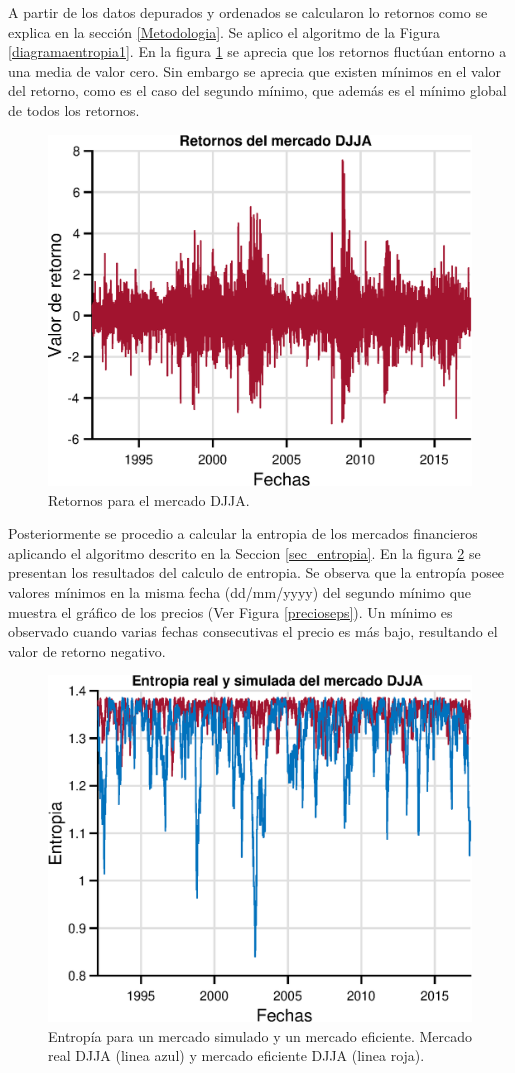 A partir de los datos depurados y ordenados se calcularon lo retornos como se explica en la sección \ref{Metodologia}. Se aplico el algoritmo de la Figura \ref{diagramaentropia1}. 
En la figura \ref{onlyreturnseps} se aprecia que los retornos fluctúan entorno a una media de valor cero. 
Sin embargo se aprecia que existen mínimos en el valor del retorno, como es el caso del segundo mínimo, que además es el mínimo global de todos los retornos.

\begin{figure}[h]
	\centering
	\includegraphics[width=0.7\linewidth]{figures/onlyreturnseps}
	\caption{Retornos para el mercado DJJA.}
	\label{onlyreturnseps}
\end{figure}

Posteriormente se procedio a calcular la entropia de los mercados financieros aplicando el algoritmo descrito en la Seccion \ref{sec_entropia}.
En la figura \ref{onlyentropyeps} se presentan los resultados del calculo de entropia.
Se observa que la entropía posee valores mínimos en la misma fecha (dd/mm/yyyy) del segundo mínimo que muestra el gráfico de los precios (Ver Figura \ref{precioseps}). 
Un mínimo es observado cuando varias fechas consecutivas el precio es más bajo, resultando el valor de retorno negativo. 


\begin{figure}[h]
	\centering
	\includegraphics[width=0.7\linewidth]{figures/onlyentropyeps}
	\caption{Entropía para un mercado simulado y un mercado eficiente. Mercado real DJJA (linea azul) y mercado eficiente DJJA (linea roja).}
	\label{onlyentropyeps}
\end{figure}



